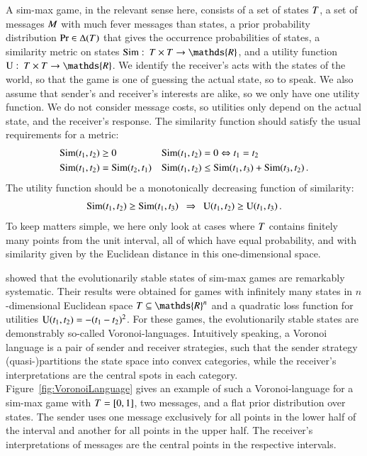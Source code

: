 A sim-max game, in the relevant sense here, consists of a set of
states $T$, a set of messages $M$ with much fever messages
than states, a prior probability distribution $\Pr \in
\Delta(T)$ that gives the occurrence probabilities of states, a
similarity metric on states $\similarity \mycolon \States \times
\States \rightarrow \mathds{R}$, and a utility function $\Utils
\mycolon \States \times \States \rightarrow \mathds{R}$. We identify
the receiver's acts with the states of the world, so that the game is
one of guessing the actual state, so to speak. We also assume that
sender's and receiver's interests are alike, so we only have one
utility function. We do not consider message costs, so utilities only
depend on the actual state, and the receiver's response. The
similarity function should satisfy the usual requirements for a
metric:
\begin{align*}
  & \mathrm{Sim}(t_{\mathrm{1}}, t_{\mathrm{2}}) \ge 0 &&
  \mathrm{Sim}(t_{\mathrm{1}}, t_{\mathrm{2}}) = 0 \Leftrightarrow
  t_{\mathrm{1}} = t_{\mathrm{2}} \\
  & \mathrm{Sim}(t_{\mathrm{1}}, t_{\mathrm{2}}) = \mathrm{Sim}(t_{\mathrm{2}},
  t_{\mathrm{1}}) && \mathrm{Sim}(t_{\mathrm{1}}, t_{\mathrm{2}}) \le
  \mathrm{Sim}(t_{\mathrm{1}}, t_{\mathrm{3}}) + \mathrm{Sim}(t_{\mathrm{3}}, t_{\mathrm{2}})\,.
\end{align*}
The utility function should be a monotonically decreasing function of
similarity:
\begin{align*}
  \similarity(\mystate{1},\mystate{2}) \ge
  \similarity(\mystate{1},\mystate{3}) \ \ \Rightarrow \ \ 
  \Utils(\mystate{1},\mystate{2}) \ge
  \Utils(\mystate{1},\mystate{3})\,.
\end{align*}
To keep matters simple, we here only look at cases where $T$
contains finitely many points from the unit interval, all of which
have equal probability, and with similarity given by the Euclidean
distance in this one-dimensional space.

\citet{JagerMetzger2011:Voronoi-Languag} showed that the
evolutionarily stable states of sim-max games are remarkably
systematic. Their results were obtained for games with infinitely many
states in $n$-dimensional Euclidean space $\States \subseteq
\mathds{R}^n$ and a quadratic loss function for utilities
$\mathrm{U}(t_{\mathrm{1}}, t_{\mathrm{2}}) = - (t_{\mathrm{1}} -
t_{\mathrm{2}})^2$. For these games, the evolutionarily stable states are
demonstrably so-called Voronoi-languages. Intuitively speaking, a
Voronoi language is a pair of sender and receiver strategies, such
that the sender strategy (quasi-)partitions the state space into
convex categories, while the receiver's interpretations are the
central spots in each category. Figure~\ref{fig:VoronoiLanguage} gives
an example of such a Voronoi-language for a sim-max game with $T
= [0,1]$, two messages, and a flat prior distribution over states. The
sender uses one message exclusively for all points in the lower half
of the interval and another for all points in the upper half. The
receiver's interpretations of messages are the central points in the
respective intervals.

